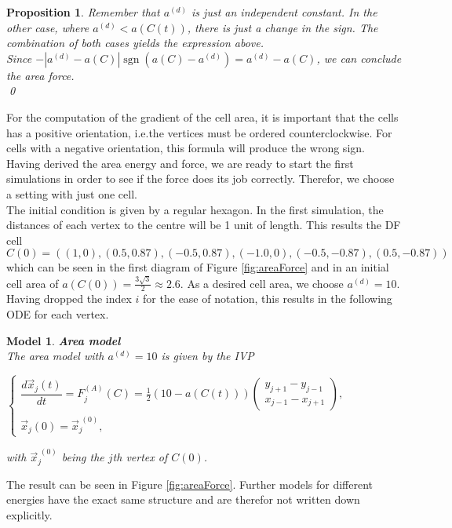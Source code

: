 \documentclass[a4paper,12pt,leqno]{article}
\theoremstyle{plain}
\newtheorem{proposition}[theorem]{Proposition}
\newtheorem{model}[theorem]{Model}
\theoremstyle{remark}
\DeclareMathOperator{\sgn}{sgn}
\begin{document}
\begin{proposition}
	Remember that $a^{(d)}$ is just an independent constant. In the other case, where $a^{(d)} < a(C(t))$, there is just a change in the sign. The combination of both cases yields the expression above. \\ 
	Since $- | a^{(d)} - a(C) | \sgn(a(C) - a^{(d)}) = a^{(d)} - a(C)$, we can conclude the area force. \\
	\qed
\end{proposition}
For the computation of the gradient of the cell area, it is important that the cells has a positive orientation, i.e.the vertices must be ordered counterclockwise. For cells with a negative orientation, this formula will produce the wrong sign. \\ 
Having derived the area energy and force, we are ready to start the first simulations in order to see if the force does its job correctly. Therefor, we choose a setting with just one cell. \\
The initial condition is given by a regular hexagon. In the first simulation, the distances of each vertex to the centre will be 1 unit of length. This results the DF cell $ C(0) = ( (1, 0), (0.5, 0.87), (-0.5, 0.87), (-1.0, 0), (-0.5, -0.87), (0.5, -0.87))$ which can be seen in the first diagram of Figure \ref{fig:areaForce}
and in an initial cell area of $a(C(0)) = \frac{3 \sqrt{3}}{2} \approx 2.6$. 
As a desired cell area, we choose $a^{(d)} = 10$. Having dropped the index $i$ for the ease of notation, this results in the following ODE for each vertex.
\begin{model} \textbf{Area model} \label{model:area} \\
	The area model with $a^{(d)} = 10 $ is given by the IVP 
	\begin{center}
			$
			\begin{cases}
				\dfrac{d \vec{x}_j(t)}{d t} = F_{j}^{(A)}(C) =  \frac{1}{2}( 10 - a(C(t))) \begin{pmatrix} 		y_{j+1} - y_{j-1} \\ x_{j-1} - x_{j+1} \end{pmatrix}, \\
				\vec{x}_j(0) = \vec{x}_j^{\;(0)}, 
			\end{cases}
			$
	\end{center}
	with $\vec{x}_j^{\;(0)}$ being the $j$th vertex of $C(0)$.	
\end{model}
The result can be seen in Figure \ref{fig:areaForce}. Further models for different energies have the exact same structure and are therefor not written down explicitly. 
\end{document}
